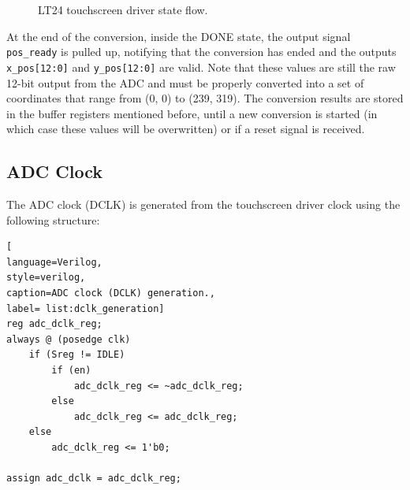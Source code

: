 \documentclass[11pt]{report}
\begin{document}
\begin{figure}[!h]
\centering
{}
\caption{LT24 touchscreen driver state flow.}
\label{fig:touchscreen_driver_fsm}
\end{figure}
At the end of the conversion, inside the DONE state, the output signal \texttt{pos\_ready} is pulled up, notifying that the conversion has ended and the outputs \texttt{x\_pos[12:0]} and \texttt{y\_pos[12:0]} are valid. Note that these values are still the raw 12-bit output from the ADC and must be properly converted into a set of coordinates that range from (0, 0) to (239, 319).
The conversion results are stored in the buffer registers mentioned before, until a new conversion is started (in which case these values will be overwritten) or if a reset signal is received. 

\subsection{ADC Clock}\label{sec:adc_clock}
The ADC clock (DCLK) is generated from the touchscreen driver clock using the following structure:

\begin{lstlisting}[
language=Verilog,
style=verilog,
caption=ADC clock (DCLK) generation.,
label= list:dclk_generation]
reg adc_dclk_reg;
always @ (posedge clk)
    if (Sreg != IDLE)
        if (en)
            adc_dclk_reg <= ~adc_dclk_reg;
        else
            adc_dclk_reg <= adc_dclk_reg;
    else
        adc_dclk_reg <= 1'b0;

assign adc_dclk = adc_dclk_reg;
\end{lstlisting}
\end{document}
